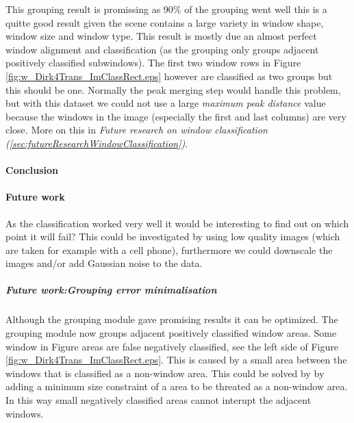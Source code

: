 This grouping result is promissing as 90\% of the grouping went well 
this is a quitte good result given the scene contains a large variety in window
shape, window size and window type.
This result is mostly due an almost perfect window alignment and classification 
(as the grouping only groups adjacent positively classified subwindows).
The first two window rows in Figure \ref{fig:w_Dirk4Trans_ImClassRect.eps}
however are classified as two groups but this should be one.
Normally the peak merging step would handle this problem, but with this dataset
we could not use a large \emph{maximum peak distance} value because the windows
in the image (especially the first and last columns) are very close.  More on
this in \emph{Future research on window classification
(\ref{sec:futureResearchWindowClassification})}.


\paragraph{Conclusion} %

\paragraph{Future work} %
\label{sec:futureResearchWindowClassification}
As the classification worked very well it would be interesting to find out on which
point it will fail?  This could be investigated by using low quality images (which are taken for
example with a cell phone), furthermore we could downscale the images and/or add
Gaussian noise to the data.

\subparagraph{Future work:Grouping error minimalisation}
Although the grouping module gave promising results it can be optimized.  The
grouping module now groups adjacent positively classified window areas.  Some
window in Figure areas are false negatively classified, see the left side of
Figure \ref{fig:w_Dirk4Trans_ImClassRect.eps}.  This is caused by a small area
between the windows that is classified as a non-window area. This could be
solved by by adding a minimum size constraint of a area to be threated as a
non-window area.  In this way small negatively classified areas cannot interupt
the adjacent windows.

